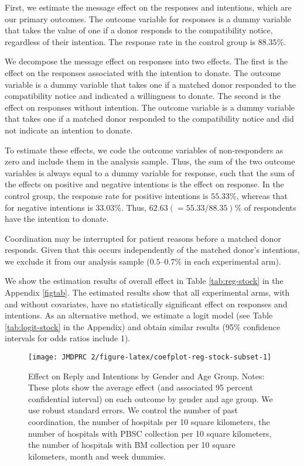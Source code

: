 \documentclass[12pt, a4paper]{article}
\begin{document}
First, we estimate the message effect on the responses and intentions, which are our primary outcomes. The outcome variable for responses is a dummy variable that takes the value of one if a donor responds to the compatibility notice, regardless of their intention. The response rate in the control group is \(88.35\)\%.

We decompose the message effect on responses into two effects. The first is the effect on the responses associated with the intention to donate. The outcome variable is a dummy variable that takes one if a matched donor responded to the compatibility notice and indicated a willingness to donate. The second is the effect on responses without intention. The outcome variable is a dummy variable that takes one if a matched donor responded to the compatibility notice and did not indicate an intention to donate.

To estimate these effects, we code the outcome variables of non-responders as zero and include them in the analysis sample. Thus, the sum of the two outcome variables is always equal to a dummy variable for response, such that the sum of the effects on positive and negative intentions is the effect on response. In the control group, the response rate for positive intentions is \(55.33\)\%, whereas that for negative intentions is \(33.03\)\%. Thus, \(62.63(=55.33/88.35)\)\% of respondents have the intention to donate.

Coordination may be interrupted for patient reasons before a matched donor responds. Given that this occurs independently of the matched donor's intentions, we exclude it from our analysis sample (\(0.5\)--\(0.7\)\% in each experimental arm).

We show the estimation results of overall effect in Table \ref{tab:reg-stock} in the Appendix \ref{figtab}. The estimated results show that all experimental arms, with and without covariates, have no statistically significant effect on responses and intentions. As an alternative method, we estimate a logit model (see Table \ref{tab:logit-stock} in the Appendix) and obtain similar results (95\% confidence intervals for odds ratios include 1).

\begin{figure}[t]
\texttt{[image: JMDPRC~2/figure-latex/coefplot-reg-stock-subset-1]} \caption{Effect on Reply and Intentions by Gender and Age Group. Notes: These plots show the average effect (and associated 95 percent confidential interval) on each outcome by gender and age group. We use robust standard errors. We control the number of past coordination, the number of hospitals per 10 square kilometers, the number of hospitals with PBSC collection per 10 square kilometers, the number of hospitals with BM collection per 10 square kilometers, month and week dummies.}\label{fig:coefplot-reg-stock-subset}
\end{figure}
\end{document}
